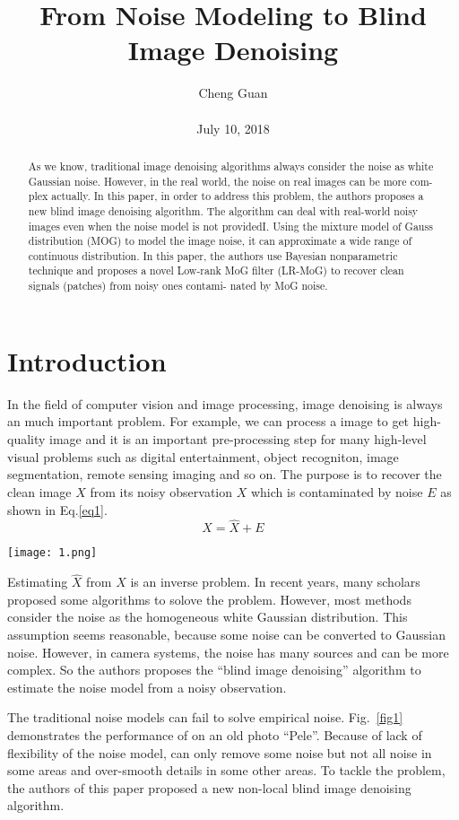 \documentclass[10pt,twocolumn,letterpaper]{article}
\title{From Noise Modeling to Blind Image Denoising}
\author{Cheng Guan\\\\
July 10, 2018}
\begin{document}
\maketitle
\begin{abstract}
As we know, traditional image denoising algorithms always consider
the noise as  white Gaussian noise.
However, in the real world, the noise on real images can be more com-
plex actually. In this paper, in order to address this problem, the authors
proposes a new blind image denoising algorithm. The algorithm can deal with real-world noisy images even when the noise model is not providedI. Using the mixture model of Gauss distribution (MOG) to model the image noise, it can approximate a wide range of continuous distribution. In this paper, the authors use Bayesian nonparametric technique
and proposes a novel Low-rank MoG filter (LR-MoG) to
recover clean signals (patches) from noisy ones contami-
nated by MoG noise.
\end{abstract}
\section{Introduction}
In the field of computer vision and image processing, image denoising
is always an much important problem. For example, we can process a
image to get high-quality image and it is an important pre-processing step
for many high-level visual problems such as digital entertainment, 
object recogniton, image segmentation, remote sensing imaging and so on. The
purpose is to recover the clean image $\hat{X}$ from its noisy 
observation $X$ which is contaminated by noise $E$ as shown in Eq.\ref{eq1}.
\begin{equation}
X = \hat{X} + E
\label{eq1}
\end{equation}
\begin{figure*}
	\centering
	\texttt{[image: 1.png]}
	\caption{From left to right: an old photo ``Pele'' with noise; the denoising result of \cite{lebrun2015multiscale} and ours. Zoom in for better visualization.
	}\label{fig1}
\end{figure*}
Estimating $\hat{X}$ from $X$ is an inverse problem. In recent years, 
many scholars proposed some algorithms \cite{starck2002curvelet,burger1996structure,dabov2007image,buades2005non,elad2006image,lebrun2015noise} to
solove the problem. However, most methods consider the noise as the
homogeneous white Gaussian distribution. This assumption seems reasonable,
because some noise can be converted to Gaussian noise. However, in 
camera systems, the noise has many sources and can be more complex.
So the authors proposes the ``blind image denoising'' algorithm to estimate 
the noise model from a noisy observation.
\par
The traditional noise models can  fail to solve empirical
noise. Fig.~\ref{fig1} demonstrates the performance of \cite{lebrun2015multiscale} on an
old photo ``Pele''. Because of lack of flexibility of the noise
model, \cite{lebrun2015multiscale} can only remove some noise but not all noise
in some areas and over-smooth details in some other areas.
To tackle the problem, the authors of this paper proposed a new non-local 
blind image denoising algorithm.
\end{document}
